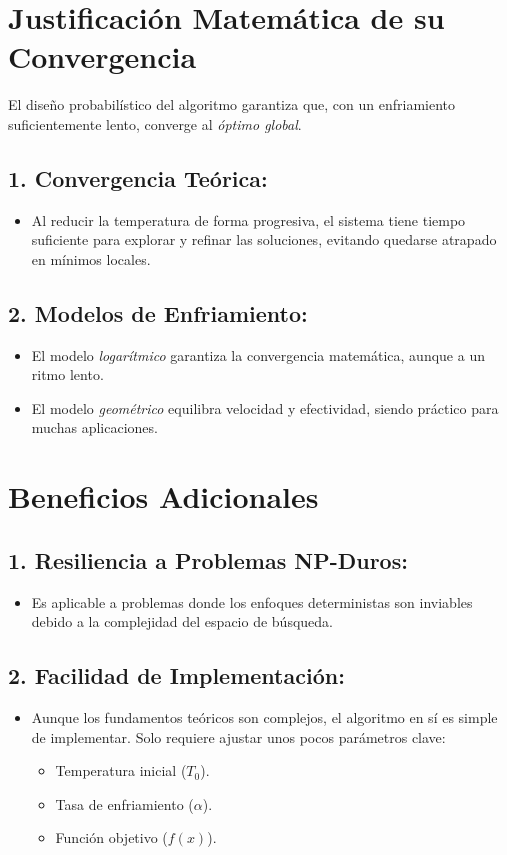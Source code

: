 \documentclass{article}
\begin{document}
\section{Justificación Matemática de su Convergencia}

El diseño probabilístico del algoritmo garantiza que, con un enfriamiento suficientemente lento, converge al \textit{óptimo global}.

\subsection{1. Convergencia Teórica:}
\begin{itemize}
    \item Al reducir la temperatura de forma progresiva, el sistema tiene tiempo suficiente para explorar y refinar las soluciones, evitando quedarse atrapado en mínimos locales.
\end{itemize}

\subsection{2. Modelos de Enfriamiento:}
\begin{itemize}
    \item El modelo \textit{logarítmico} garantiza la convergencia matemática, aunque a un ritmo lento.
    \item El modelo \textit{geométrico} equilibra velocidad y efectividad, siendo práctico para muchas aplicaciones.
\end{itemize}

\section{Beneficios Adicionales}

\subsection{1. Resiliencia a Problemas NP-Duros:}
\begin{itemize}
    \item Es aplicable a problemas donde los enfoques deterministas son inviables debido a la complejidad del espacio de búsqueda.
\end{itemize}

\subsection{2. Facilidad de Implementación:}
\begin{itemize}
    \item Aunque los fundamentos teóricos son complejos, el algoritmo en sí es simple de implementar. Solo requiere ajustar unos pocos parámetros clave:
    \begin{itemize}
        \item Temperatura inicial ($T_0$).
        \item Tasa de enfriamiento ($\alpha$).
        \item Función objetivo ($f(x)$).
    \end{itemize}
\end{itemize}
\end{document}

